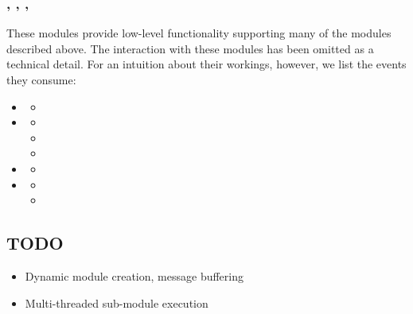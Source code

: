 \documentclass{article}
\begin{document}
\subsubsection{, , , }

These modules provide low-level functionality supporting many of the modules described above.
The interaction with these modules has been omitted as a technical detail.
For an intuition about their workings, however, we list the events they consume:
\begin{itemize}
    
    \item {}
    \begin{itemize}
        \item {}
    \end{itemize}
    
    \item {}
    \begin{itemize}
        \item {}
        \item {}
        \item {}
    \end{itemize}

    \item {}
    \begin{itemize}
        \item {}
    \end{itemize}

    \item {}
    \begin{itemize}
        \item {}
        \item {}
    \end{itemize}
    
\end{itemize}

\subsection{TODO}

\begin{itemize}
    \item Dynamic module creation, message buffering
    \item Multi-threaded sub-module execution
\end{itemize}
\end{document}
